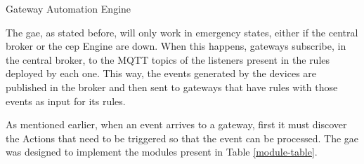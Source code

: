 \begin{Paragraph}{Gateway Automation Engine}

The \acf{gae}, as stated before, will only work in emergency states, either if the central broker or the \ac{cep} Engine are down. When this happens, gateways subscribe, in the central broker, to the MQTT topics of the listeners present in the rules deployed by each one. This way, the events generated by the devices are published in the broker and then sent to gateways that have rules with those events as input for its rules. 

As mentioned earlier, when an event arrives to a gateway, first it must discover the Actions that need to be triggered so that the event can be processed. The \ac{gae} was designed to implement the modules present in Table \ref{module-table}.
 
\begin{table}[H]


\end{table}
\end{Paragraph}
